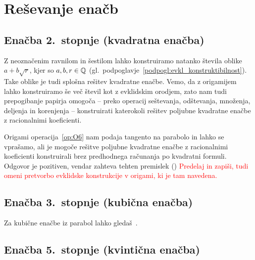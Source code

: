 \section{Reševanje enačb}
\label{pogl:enacbe}



\subsection{Enačba 2.\ stopnje (kvadratna enačba)}

Z neoznačenim ravnilom in šestilom  lahko konstruiramo natanko števila oblike $a + b\sqrt{r}$, kjer so $a, b, r \in \mathbb Q$ (gl.\ podpoglavje~\ref{podpogl:evkl_konstruktibilnost}). Take oblike je tudi splošna rešitev kvadratne enačbe. Vemo, da z origamijem lahko konstruiramo še več števil kot z evklidskim orodjem, zato nam tudi prepogibanje papirja omogoča -- preko operacij seštevanja, odštevanja, množenja, deljenja in korenjenja -- konstruirati katerokoli rešitev poljubne kvadratne enačbe z racionalnimi koeficienti.

Origami operacija~\ref{op:O6} nam podaja tangento na parabolo in lahko se vprašamo, ali je mogoče rešitve poljubne kvadratne enačbe z racionalnimi koeficienti konstruirali brez predhodnega računanja po kvadratni formuli. Odgovor je pozitiven, vendar zahteva tehten premislek (\cite[str.\ 36--38]{hull2020}) \textcolor{red}{Predelaj in zapiši, tudi omeni pretvorbo evklidske konstrukcije v origami, ki je tam navedena.}

\subsection{Enačba 3.\ stopnje (kubična enačba)}

Za kubične enačbe iz parabol lahko gledaš~\cite[str.\ 150]{geometricconstructions}.


\subsection{Enačba 5.\ stopnje (kvintična enačba)}